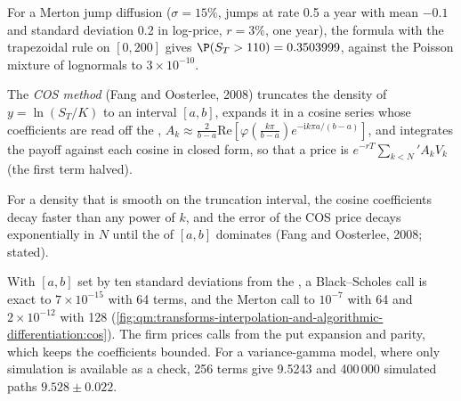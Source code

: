 For a Merton jump diffusion ($\sigma = 15\%$, jumps at rate 0.5 a year with mean $-0.1$ and standard deviation 0.2 in log-price, $r = 3\%$, one year), the formula with the trapezoidal rule on $[0, 200]$ gives
$\P(S_T > 110) = 0.3503999$, against the Poisson mixture of lognormals to $3 \times 10^{-10}$.

\begin{definition}\label{def:qm:transforms-interpolation-and-algorithmic-differentiation:cos}
The \emph{COS method} (Fang and Oosterlee, 2008) truncates the density of $y = \ln(S_T/K)$ to an interval $[a, b]$, expands it in a cosine series whose coefficients are read off the
, $A_k \approx \frac2{b-a}\mathrm{Re}[\varphi(\frac{k\pi}{b-a})e^{-\mathrm ik\pi a/(b-a)}]$, and integrates the payoff against each cosine in closed form, so that a price is
$e^{-rT}\sum_{k<N}{}'A_kV_k$ (the first term halved).
\end{definition}

\begin{proposition}\label{prop:qm:transforms-interpolation-and-algorithmic-differentiation:cosconv}
For a density that is smooth on the truncation interval, the cosine coefficients decay faster than any power of $k$, and the error of the COS price decays exponentially in $N$ until the 
of $[a, b]$ dominates (Fang and Oosterlee, 2008; stated).
\end{proposition}

With $[a, b]$ set by ten standard deviations from the , a Black--Scholes call is exact to $7 \times 10^{-15}$ with 64 terms, and the Merton call to $10^{-7}$ with 64 and $2 \times 10^{-12}$ with 128
(\cref{fig:qm:transforms-interpolation-and-algorithmic-differentiation:cos}). The firm prices calls from the put expansion and parity, which keeps the coefficients bounded. For a variance-gamma model,
where only simulation is available as a check, 256 terms give 9.5243 and 400\,000 simulated paths $9.528 \pm 0.022$.

